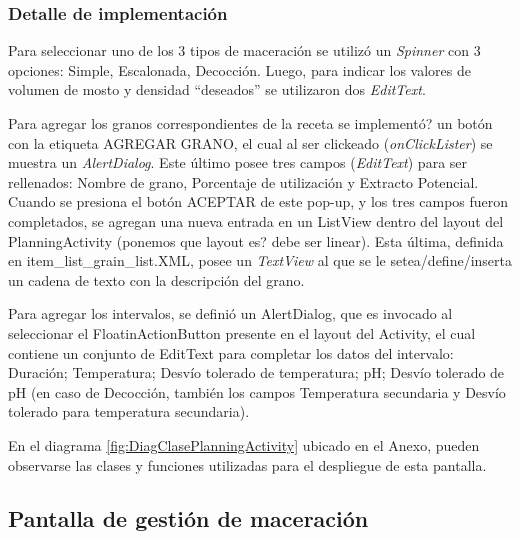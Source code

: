             \subsubsection{Detalle de implementación}
                \par Para seleccionar uno de los 3 tipos de maceración se utilizó un \textit{Spinner} con 3 opciones: Simple, Escalonada, Decocción. Luego, para indicar los valores de volumen de mosto y densidad ``deseados'' se utilizaron dos \textit{EditText}.
                
                \par Para agregar los granos correspondientes de la receta se implementó? un botón con la etiqueta AGREGAR GRANO, el cual al ser clickeado (\textit{onClickLister}) se muestra un \textit{AlertDialog}. Este último posee tres campos (\textit{EditText}) para ser rellenados: Nombre de grano, Porcentaje de utilización y Extracto Potencial. Cuando se presiona el botón ACEPTAR de este pop-up, y los tres campos fueron completados, se agregan una nueva entrada en un ListView dentro del layout del PlanningActivity (ponemos que layout es? debe ser linear). Esta última, definida en item\_list\_grain\_list.XML, posee un \textit{TextView} al que se le setea/define/inserta un cadena de texto con la descripción del grano. %
                
                \par Para agregar los intervalos, se definió un AlertDialog, que es invocado al seleccionar el FloatinActionButton presente en el layout del Activity, el cual contiene un conjunto de EditText para completar los datos del intervalo: Duración; Temperatura; Desvío tolerado de temperatura; pH; Desvío tolerado de pH (en caso de Decocción, también los campos Temperatura secundaria y Desvío tolerado para temperatura secundaria).
                
                \par En el diagrama \ref{fig:DiagClasePlanningActivity} ubicado en el Anexo, pueden observarse las clases y funciones utilizadas para el despliegue de esta pantalla.
        
        \subsection{Pantalla de gestión de maceración}
        \label{DescripPantallaGestiónMaceración}
